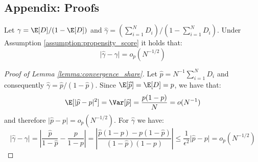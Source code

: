 \newpage
\begin{appendix}
    \section{Appendix: Proofs}
    \renewcommand{\theequation}{\thesection\arabic{equation}}
    \setcounter{equation}{0}
    \renewcommand{\thelemma}{\thesection\arabic{lemma}}

    \begin{lemma}
        \label{lemma:convergence_share}
        Let $\gamma = \E[D]/(1-\E[D])$ and $\widehat{\gamma} = \left(\sum_{i=1}^N D_i\right)/\left(1-\sum_{i=1}^N D_i\right)$. Under Assumption \ref{assumption:propensity_score} it holds that:
        \begin{equation*}
            \vert \widehat{\gamma} - \gamma \vert = o_p(N^{-1/2})
        \end{equation*}
    \end{lemma}

\begin{proof}[Proof of Lemma \ref{lemma:convergence_share}]
    Let $\widehat{p} = N^{-1} \sum_{i=1}^N D_i$ and consequently $\widehat{\gamma} = \widehat{p}/(1-\widehat{p}).$ Since $\E[\widehat{p}] = \E[D] = p$, we have that:
    \begin{align*}
        \E[\vert \widehat{p} - p \vert^2] = \Var[\widehat{p}] = \frac{p(1-p)}{N} = o(N^{-1})
    \end{align*}
    and therefore $\vert \widehat{p} - p \vert = o_p(N^{-1/2})$. For $\widehat{\gamma}$ we have:
    \begin{equation*}
        \vert \widehat{\gamma} - \gamma \vert = \left\vert \frac{\widehat{p}}{1-\widehat{p}} - \frac{p}{1-p} \right\vert = \left\vert \frac{\widehat{p}(1-p) - p(1-\widehat{p})}{(1-\widehat{p})(1-p)} \right\vert \leq  \frac{1}{\epsilon^2} \vert \widehat{p} - p \vert = o_p(N^{-1/2})
    \end{equation*}
\end{proof}



\end{appendix}

